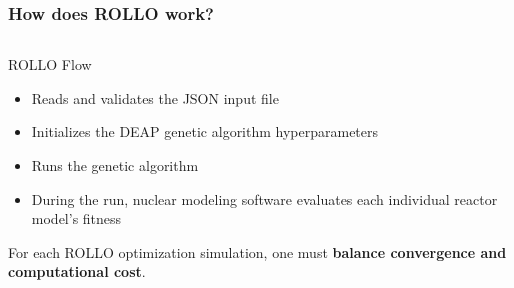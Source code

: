 \begin{frame}
    \frametitle{How does ROLLO work?}
    \begin{columns}
        \begin{column}{0.7\textwidth}

            \vspace{-0.5cm}
            ROLLO Flow 
            \begin{itemize}
                \item Reads and validates the JSON input file
                \item Initializes the \acrfull{DEAP} genetic algorithm hyperparameters
                \item Runs the genetic algorithm  
                \item During the run, nuclear modeling software evaluates each individual 
                reactor model's fitness
            \end{itemize}

            \vspace{0.2cm}
            For each ROLLO optimization simulation, one must \textbf{balance convergence and 
            computational cost}. 


\end{column}
\end{columns}
\end{frame}
